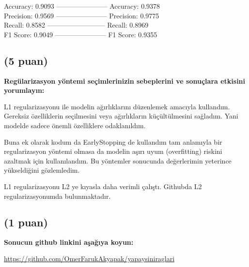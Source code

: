 \documentclass[11pt]{article}
\begin{document}
Accuracy: 0.9093 ----------------------- Accuracy: 0.9378  \\
Precision: 0.9569 ----------------------- Precision: 0.9775 \\
Recall: 0.8582 -------------------------- Recall: 0.8969    \\
F1 Score: 0.9049 ----------------------- F1 Score: 0.9355

\subsection{(5 puan)} \textbf{Regülarizasyon yöntemi seçimlerinizin sebeplerini ve sonuçlara etkisini yorumlayın:}

 L1 regularizasyonu ile modelin ağırlıklarını düzenlemek amacıyla kullandım. Gereksiz özelliklerin seçilmesini veya ağırlıkların küçültülmesini sağladım. Yani modelde sadece önemli özelliklere odaklanıldım. 
 
 Buna ek olarak kodum da EarlyStopping de kullandım tam anlamıyla bir regularizasyon yöntemi olmasa da modelin aşırı uyum (overfitting) riskini azaltmak için kullanılandım. Bu yöntemler sonucunda değerlerimin yeterince yükseldiğini gözlemledim. 
 
 L1 regularizasyonu L2 ye kıyasla daha verimli çalıştı. Githubda L2 regularizasyonumda bulunmaktadır.

\subsection{(1 puan)} \textbf{Sonucun github linkini  aşağıya koyun:}

\url{https://github.com/OmerFarukAkyapak/yapaysiniraglari}
\end{document}
